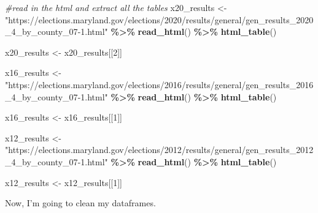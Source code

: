 \documentclass[
]{article}
\newenvironment{Shaded}{\begin{snugshade}}{\end{snugshade}}
\newcommand{\CommentTok}[1]{\textcolor[rgb]{0.56,0.35,0.01}{\textit{#1}}}
\newcommand{\DecValTok}[1]{\textcolor[rgb]{0.00,0.00,0.81}{#1}}
\newcommand{\FunctionTok}[1]{\textcolor[rgb]{0.13,0.29,0.53}{\textbf{#1}}}
\newcommand{\NormalTok}[1]{#1}
\newcommand{\OtherTok}[1]{\textcolor[rgb]{0.56,0.35,0.01}{#1}}
\newcommand{\SpecialCharTok}[1]{\textcolor[rgb]{0.81,0.36,0.00}{\textbf{#1}}}
\newcommand{\StringTok}[1]{\textcolor[rgb]{0.31,0.60,0.02}{#1}}
\begin{document}
\begin{Shaded}
\begin{Highlighting}[]
\CommentTok{\#read in the html and extract all the tables}
\NormalTok{x20\_results }\OtherTok{\textless{}{-}} \StringTok{"https://elections.maryland.gov/elections/2020/results/general/gen\_results\_2020\_4\_by\_county\_07{-}1.html"} \SpecialCharTok{\%\textgreater{}\%}
  \FunctionTok{read\_html}\NormalTok{() }\SpecialCharTok{\%\textgreater{}\%}
  \FunctionTok{html\_table}\NormalTok{()}

\NormalTok{x20\_results }\OtherTok{\textless{}{-}}\NormalTok{ x20\_results[[}\DecValTok{2}\NormalTok{]]}

\NormalTok{x16\_results }\OtherTok{\textless{}{-}} \StringTok{"https://elections.maryland.gov/elections/2016/results/general/gen\_results\_2016\_4\_by\_county\_07{-}1.html"} \SpecialCharTok{\%\textgreater{}\%}   \FunctionTok{read\_html}\NormalTok{() }\SpecialCharTok{\%\textgreater{}\%}
  \FunctionTok{html\_table}\NormalTok{()}

\NormalTok{x16\_results }\OtherTok{\textless{}{-}}\NormalTok{ x16\_results[[}\DecValTok{1}\NormalTok{]]}

\NormalTok{x12\_results }\OtherTok{\textless{}{-}} \StringTok{"https://elections.maryland.gov/elections/2012/results/general/gen\_results\_2012\_4\_by\_county\_07{-}1.html"} \SpecialCharTok{\%\textgreater{}\%}
  \FunctionTok{read\_html}\NormalTok{() }\SpecialCharTok{\%\textgreater{}\%} 
  \FunctionTok{html\_table}\NormalTok{()}

\NormalTok{x12\_results }\OtherTok{\textless{}{-}}\NormalTok{ x12\_results[[}\DecValTok{1}\NormalTok{]]}
\end{Highlighting}
\end{Shaded}

Now, I'm going to clean my dataframes.
\end{document}
